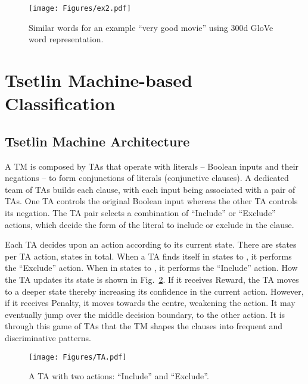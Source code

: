 \documentclass[11pt]{article}
\begin{document}
\begin{figure}
    \centering
    \texttt{[image: Figures/ex2.pdf]}
    \caption{Similar words for an example ``very good movie'' using 300d GloVe word representation.}
    \label{fig3}
\end{figure}

\section{Tsetlin Machine-based Classification}\label{TM}
\subsection{Tsetlin Machine Architecture}

A TM is composed by TAs that operate with literals -- Boolean inputs and their negations -- to form conjunctions of literals (conjunctive clauses). A dedicated team of TAs builds each clause, with each input being associated with a pair of TAs. One TA controls the original Boolean input whereas the other TA controls its negation. The TA pair selects a combination of ``Include'' or ``Exclude'' actions, which decide the form of the literal to include or exclude in the clause.

Each TA decides upon an action according to its current state. There are  states per TA action,  states in total. When a TA finds itself in states  to , it performs the ``Exclude'' action. When in states  to , it performs the ``Include'' action. How the TA updates its state is shown in Fig.~\ref{fig4}. If it receives Reward, the TA moves to a deeper state thereby increasing its confidence in the current action. However, if it receives Penalty, it moves towards the centre, weakening the action. It may eventually jump over the middle decision boundary, to the other action. It is through this game of TAs that the TM shapes the clauses into frequent and discriminative patterns.

\begin{figure}[h]
    \centering
    \texttt{[image: Figures/TA.pdf]}
    \caption{A TA with two actions: ``Include'' and ``Exclude''.}
    \label{fig4}
\end{figure}
\end{document}
